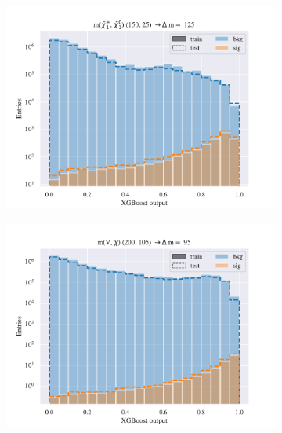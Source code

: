 \begin{figure}[H]
\begin{subfigure}[t!]{0.49\textwidth}
        \includegraphics[width = \textwidth]{Figures/WW/BDT/Low_level/Low/scaled_train_test_395268.pdf}
        \caption{}
        \label{fig:traintestscaledBDTWWLow}
    \end{subfigure}
    \begin{subfigure}[t!]{0.49\textwidth}
        \includegraphics[width = \textwidth]{Figures/Mono_Z/ML/BDT/Low_level/Low/scaled_train_test_310604.pdf}
        \caption{}
        \label{fig:traintestscaledBDTMonoZLow}
    \end{subfigure}
    \caption{}
    \label{fig:resExample}
\end{figure}

